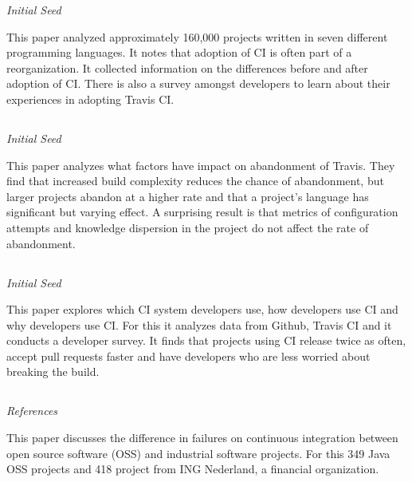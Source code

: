 \documentclass[]{book}
\begin{document}
\emph{Initial Seed}

This paper analyzed approximately 160,000 projects written in seven
different programming languages. It notes that adoption of CI is often
part of a reorganization. It collected information on the differences
before and after adoption of CI. There is also a survey amongst
developers to learn about their experiences in adopting Travis CI.

\subsection{\texorpdfstring{\citet{widder2018m}}{@widder2018m}}\label{widder2018m}

\emph{Initial Seed}

This paper analyzes what factors have impact on abandonment of Travis.
They find that increased build complexity reduces the chance of
abandonment, but larger projects abandon at a higher rate and that a
project's language has significant but varying effect. A surprising
result is that metrics of configuration attempts and knowledge
dispersion in the project do not affect the rate of abandonment.

\subsection{\texorpdfstring{\citet{hilton2016usage}}{@hilton2016usage}}\label{hilton2016usage}

\emph{Initial Seed}

This paper explores which CI system developers use, how developers use
CI and why developers use CI. For this it analyzes data from Github,
Travis CI and it conducts a developer survey. It finds that projects
using CI release twice as often, accept pull requests faster and have
developers who are less worried about breaking the build.

\subsection{\texorpdfstring{\citet{vassallo2017tale}}{@vassallo2017tale}}\label{vassallo2017tale}

\emph{References \citet{beller2017oops} }

This paper discusses the difference in failures on continuous
integration between open source software (OSS) and industrial software
projects. For this 349 Java OSS projects and 418 project from ING
Nederland, a financial organization.
\end{document}
